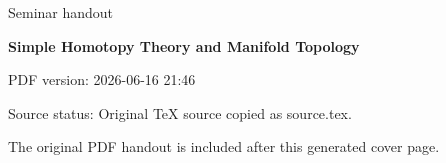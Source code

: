 \documentclass[11pt,a4paper]{article}
\newcommand{\seminartitle}{Simple Homotopy Theory and Manifold Topology}
\newcommand{\seminarsubtitle}{Seminar handout}
\newcommand{\seminardate}{2026-06-16 21:46}
\newcommand{\seminarsourcestatus}{Original TeX source copied as source.tex.}
\begin{document}
\begin{titlepage}
\thispagestyle{empty}
\vspace*{0.16\textheight}
{\Large\color{seminarblue}\seminarsubtitle\par}
\vspace{1.5em}
{\LARGE\bfseries \seminartitle\par}
\vspace{2em}
{\large PDF version: \seminardate\par}
\vfill
{\small Source status: \seminarsourcestatus\par}
\vspace{1em}
{\small The original PDF handout is included after this generated cover page.\par}
\end{titlepage}

\clearpage
\hypersetup{pageanchor=false}

\end{document}
